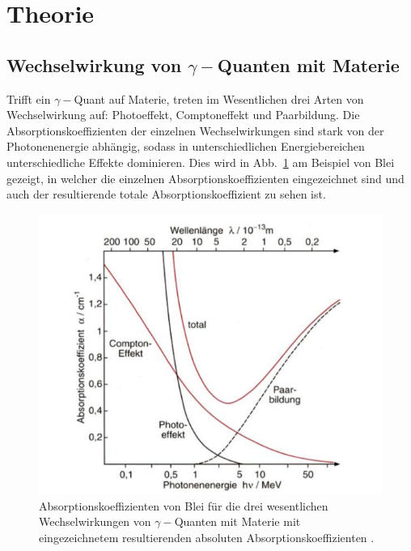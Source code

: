 \section{Theorie}
\label{sec:Theorie}

        \subsection{Wechselwirkung von \texorpdfstring{$\gamma-$}\,Quanten mit Materie}

            Trifft ein $\gamma-$Quant auf Materie, treten im Wesentlichen 
            drei Arten von Wechselwirkung auf: Photoeffekt, Comptoneffekt 
            und Paarbildung. Die Absorptionskoeffizienten der einzelnen 
            Wechselwirkungen sind stark von der Photonenenergie abhängig,
            sodass in unterschiedlichen Energiebereichen unterschiedliche
            Effekte dominieren. Dies wird in Abb.~\ref{fig:blei} am Beispiel
            von Blei gezeigt, in welcher die einzelnen Absorptionskoeffizienten 
            eingezeichnet sind und
            auch der resultierende totale Absorptionskoeffizient zu sehen ist.

            \begin{figure}
                \centering
                \includegraphics{blei.png}
                \caption{Absorptionskoeffizienten von Blei für die drei wesentlichen 
                Wechselwirkungen von $\gamma-$Quanten mit Materie mit eingezeichnetem 
                resultierenden absoluten Absorptionskoeffizienten \cite{blei}.}
                \label{fig:blei}
            \end{figure}

